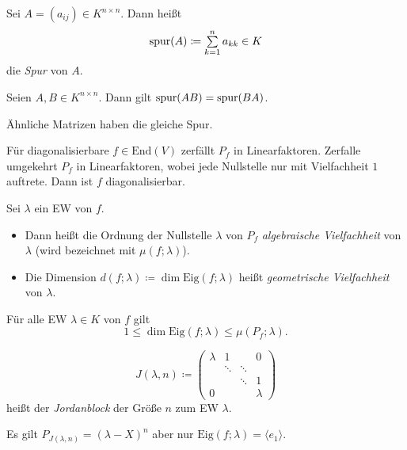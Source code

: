 \documentclass{cheat-sheet}
\newcommand{\End}{\mathrm{End}}
\newcommand{\Eig}{\mathrm{Eig}}
\begin{document}
\begin{definition}
Sei $A = (a_{ij}) \in K^{n \times n}$. Dann heißt
\[ \spur(A) \coloneqq \sum_{k=1}^n a_{kk} \in K \]
die \emph{Spur} von $A$.
\end{definition}

\begin{satz}
Seien $A, B \in K^{n \times n}$. Dann gilt $\mathrm{spur}(AB) = \mathrm{spur}(BA)$.
\end{satz}

\begin{kor}
Ähnliche Matrizen haben die gleiche Spur.
\end{kor}

\begin{satz}
Für diagonalisierbare $f \in \End(V)$ zerfällt $P_f$ in Linearfaktoren. Zerfalle umgekehrt $P_f$ in Linearfaktoren, wobei jede Nullstelle nur mit Vielfachheit $1$ auftrete. Dann ist $f$ diagonalisierbar.
\end{satz}

\begin{definition}
Sei $\lambda$ ein EW von $f$.
\begin{itemize}
  \item Dann heißt die Ordnung der Nullstelle $\lambda$ von $P_f$ \emph{algebraische Vielfachheit} von $\lambda$ (wird bezeichnet mit $\mu(f; \lambda)$).
  \item Die Dimension $d(f; \lambda) \coloneqq \dim \Eig(f; \lambda)$ heißt \emph{geometrische Vielfachheit} von $\lambda$.
\end{itemize}
\end{definition}

\begin{satz}
Für alle EW $\lambda \in K$ von $f$ gilt
\[ 1 \le \dim \Eig(f; \lambda) \le \mu(P_f; \lambda). \]
\end{satz}

\begin{definition}
\[ J(\lambda, n) \coloneqq \begin{pmatrix}
  \lambda & 1 & & 0 \\
  & \ddots & \ddots & \\
  & & \ddots & 1 \\
  0 & & & \lambda
\end{pmatrix} \]
heißt der \emph{Jordanblock} der Größe $n$ zum EW $\lambda$.
\end{definition}

\begin{bem}
Es gilt $P_{J(\lambda, n)} = (\lambda - X)^n$ aber nur $\Eig(f; \lambda) = \langle e_1 \rangle$.
\end{bem}
\end{document}
